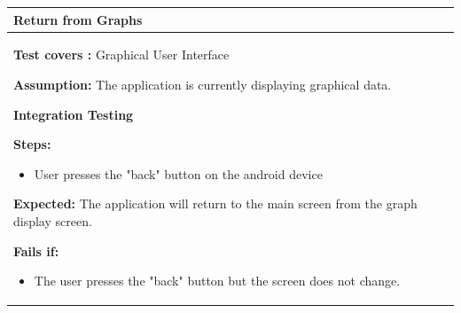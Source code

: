 \documentclass[letterpaper,english, 12pt]{scrreprt}
\begin{document}
\begin{center}
        \begin{tabular}{|C{15cm}|}
                \hline
                        \textbf{Return from Graphs}\\
                \hline
                        \begin{flushleft}
                                \textbf{Test covers : } Graphical User Interface
                        \end{flushleft}
                        \begin{flushleft}
                                \textbf{Assumption: } The application is currently displaying graphical data.
                        \end{flushleft}
			\begin{center}
				\textbf{Integration Testing}
			\end{center}
                        \begin{flushleft}
                                \textbf{Steps:}
                        \end{flushleft}
				\begin{itemize}
					\item User presses the "back" button on the android device
				\end{itemize}
			\begin{flushleft}
				\textbf{Expected: } The application will return to the main screen from the graph display screen.
			\end{flushleft}
                        \begin{flushleft}
                                \textbf{Fails if: }
                        \end{flushleft}
                                \begin{itemize}
                                        \item The user presses the "back" button but the screen does not change.
                                \end{itemize}
				\\
		\hline
        \end{tabular}
\end{center}
\end{document}
